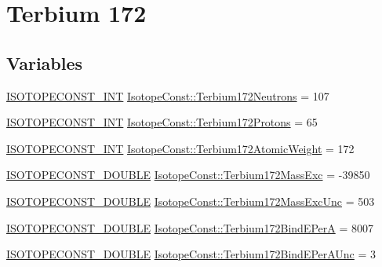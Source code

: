 \hypertarget{group___isotope_const-_terbium-_tb172}{}\section{Terbium 172}
\label{group___isotope_const-_terbium-_tb172}
\subsection*{Variables}
\begin{DoxyCompactItemize}
\item 
\mbox{\hyperlink{group___isotope_const-_macros_ga5f18360b3e99483a35c32d789e62621c}{I\+S\+O\+T\+O\+P\+E\+C\+O\+N\+S\+T\+\_\+\+I\+NT}} \mbox{\hyperlink{group___isotope_const-_terbium-_tb172_gae812478c4d830c0d94ac95486ab28536}{Isotope\+Const\+::\+Terbium172\+Neutrons}} = 107
\item 
\mbox{\hyperlink{group___isotope_const-_macros_ga5f18360b3e99483a35c32d789e62621c}{I\+S\+O\+T\+O\+P\+E\+C\+O\+N\+S\+T\+\_\+\+I\+NT}} \mbox{\hyperlink{group___isotope_const-_terbium-_tb172_gae433ab37a9e7208aaa083d584f0ad8df}{Isotope\+Const\+::\+Terbium172\+Protons}} = 65
\item 
\mbox{\hyperlink{group___isotope_const-_macros_ga5f18360b3e99483a35c32d789e62621c}{I\+S\+O\+T\+O\+P\+E\+C\+O\+N\+S\+T\+\_\+\+I\+NT}} \mbox{\hyperlink{group___isotope_const-_terbium-_tb172_ga22a5e5982fb2783c6125ef41df73ee7f}{Isotope\+Const\+::\+Terbium172\+Atomic\+Weight}} = 172
\item 
\mbox{\hyperlink{group___isotope_const-_macros_ga8f45a7272ce02c0b4c65c44636ed719a}{I\+S\+O\+T\+O\+P\+E\+C\+O\+N\+S\+T\+\_\+\+D\+O\+U\+B\+LE}} \mbox{\hyperlink{group___isotope_const-_terbium-_tb172_gac5a1f2f2fc361b63ab2640346ea832dd}{Isotope\+Const\+::\+Terbium172\+Mass\+Exc}} = -\/39850
\item 
\mbox{\hyperlink{group___isotope_const-_macros_ga8f45a7272ce02c0b4c65c44636ed719a}{I\+S\+O\+T\+O\+P\+E\+C\+O\+N\+S\+T\+\_\+\+D\+O\+U\+B\+LE}} \mbox{\hyperlink{group___isotope_const-_terbium-_tb172_gadcefc63699f4a81f891d9aeda5c6c6bf}{Isotope\+Const\+::\+Terbium172\+Mass\+Exc\+Unc}} = 503
\item 
\mbox{\hyperlink{group___isotope_const-_macros_ga8f45a7272ce02c0b4c65c44636ed719a}{I\+S\+O\+T\+O\+P\+E\+C\+O\+N\+S\+T\+\_\+\+D\+O\+U\+B\+LE}} \mbox{\hyperlink{group___isotope_const-_terbium-_tb172_ga0ba3247574b9d9ef8f1ba69f95337828}{Isotope\+Const\+::\+Terbium172\+Bind\+E\+PerA}} = 8007
\item 
\mbox{\hyperlink{group___isotope_const-_macros_ga8f45a7272ce02c0b4c65c44636ed719a}{I\+S\+O\+T\+O\+P\+E\+C\+O\+N\+S\+T\+\_\+\+D\+O\+U\+B\+LE}} \mbox{\hyperlink{group___isotope_const-_terbium-_tb172_ga98037bbe55a08f5b07e4cb7d1e70a211}{Isotope\+Const\+::\+Terbium172\+Bind\+E\+Per\+A\+Unc}} = 3

\end{DoxyCompactItemize}
